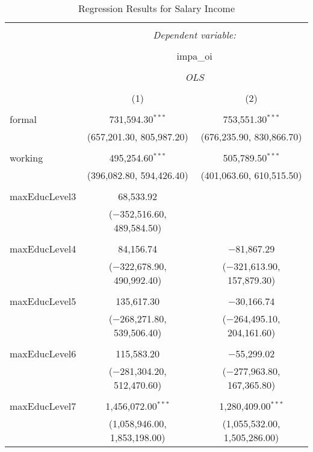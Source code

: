 
\begin{table}[!htbp] \centering 
  \caption{Regression Results for Salary Income} 
  \label{} 
\begin{tabular}{@{\extracolsep{5pt}}lcc} 
\\[-1.8ex]\hline 
\hline \\[-1.8ex] 
 & \multicolumn{2}{c}{\textit{Dependent variable:}} \\ 
\cline{2-3} 
\\[-1.8ex] & \multicolumn{2}{c}{impa\_oi} \\ 
\\[-1.8ex] & \multicolumn{2}{c}{\textit{OLS}} \\ 
\\[-1.8ex] & (1) & (2)\\ 
\hline \\[-1.8ex] 
 formal & 731,594.30$^{***}$ & 753,551.30$^{***}$ \\ 
  & (657,201.30, 805,987.20) & (676,235.90, 830,866.70) \\ 
  & & \\ 
 working & 495,254.60$^{***}$ & 505,789.50$^{***}$ \\ 
  & (396,082.80, 594,426.40) & (401,063.60, 610,515.50) \\ 
  & & \\ 
 maxEducLevel3 & 68,533.92 &  \\ 
  & ($-$352,516.60, 489,584.50) &  \\ 
  & & \\ 
 maxEducLevel4 & 84,156.74 & $-$81,867.29 \\ 
  & ($-$322,678.90, 490,992.40) & ($-$321,613.90, 157,879.30) \\ 
  & & \\ 
 maxEducLevel5 & 135,617.30 & $-$30,166.74 \\ 
  & ($-$268,271.80, 539,506.40) & ($-$264,495.10, 204,161.60) \\ 
  & & \\ 
 maxEducLevel6 & 115,583.20 & $-$55,299.02 \\ 
  & ($-$281,304.20, 512,470.60) & ($-$277,963.80, 167,365.80) \\ 
  & & \\ 
 maxEducLevel7 & 1,456,072.00$^{***}$ & 1,280,409.00$^{***}$ \\ 
  & (1,058,946.00, 1,853,198.00) & (1,055,532.00, 1,505,286.00) \\ 

\end{tabular}
\end{table}
